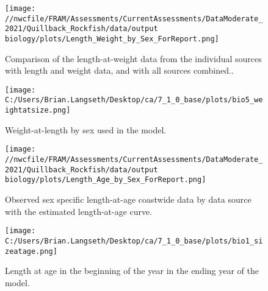 \documentclass[11pt,
  english,
  a4paper,
]{article}
\begin{document}
\begin{figure}
\centering
\texttt{[image: //nwcfile/FRAM/Assessments/CurrentAssessments/DataModerate\_2021/Quillback\_Rockfish/data/output biology/plots/Length\_Weight\_by\_Sex\_ForReport.png]}
\caption{Comparison of the length-at-weight data from the individual sources with length and weight data, and with all sources combined..\label{fig:len-weight-survey}}
\end{figure}

\tagmcend\tagstructend


\begin{figure}
\centering
\texttt{[image: C:/Users/Brian.Langseth/Desktop/ca/7\_1\_0\_base/plots/bio5\_weightatsize.png]}
\caption{Weight-at-length by sex used in the model.\label{fig:len-weight}}
\end{figure}

\tagmcend\tagstructend


\begin{figure}
\centering
\texttt{[image: //nwcfile/FRAM/Assessments/CurrentAssessments/DataModerate\_2021/Quillback\_Rockfish/data/output biology/plots/Length\_Age\_by\_Sex\_ForReport.png]}
\caption{Observed sex specific length-at-age coastwide data by data source with the estimated length-at-age curve.\label{fig:len-age-data}}
\end{figure}

\tagmcend\tagstructend


\begin{figure}
\centering
\texttt{[image: C:/Users/Brian.Langseth/Desktop/ca/7\_1\_0\_base/plots/bio1\_sizeatage.png]}
\caption{Length at age in the beginning of the year in the ending year of the model.\label{fig:len-age-ss}}
\end{figure}

\tagmcend\tagstructend

\end{document}
